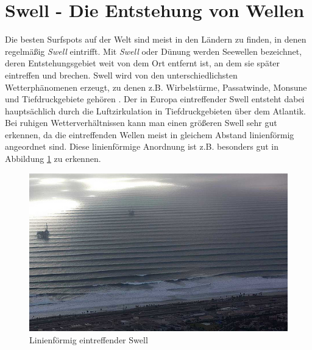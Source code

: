 \section{Swell - Die Entstehung von Wellen}
Die besten Surfspots auf der Welt sind meist in den Ländern zu finden,
in denen regelmäßig \textit{Swell} eintrifft. Mit \textit{Swell} oder
Dünung werden Seewellen bezeichnet, deren Entstehungs\-gebiet weit von
dem Ort entfernt ist, an dem sie später eintreffen und brechen. Swell
wird von den unterschiedlichsten Wetter\-phänomenen erzeugt, zu denen
z.B. Wirbelstürme, Passatwinde, Monsune und Tiefdruckgebiete gehören
\cite[S.15]{storm_europe_1998}. Der in Europa eintreffender Swell
entsteht dabei hauptsächlich durch die Luftzirkulation in
Tiefdruckgebieten über dem Atlantik. Bei ruhigen Wetterverhältnissen
kann man einen größeren Swell sehr gut erkennen, da die eintreffenden
Wellen meist in gleichem Abstand linienförmig angeordnet sind. Diese
linienförmige Anordnung ist z.B. besonders gut in Abbildung
\ref{swell-lines} zu erkennen.

\begin{figure}[h]
 \includegraphics[width=\textwidth]{bilder/swell}
 \caption{Linienförmig eintreffender Swell}
 \label{swell-lines}
\end{figure}

